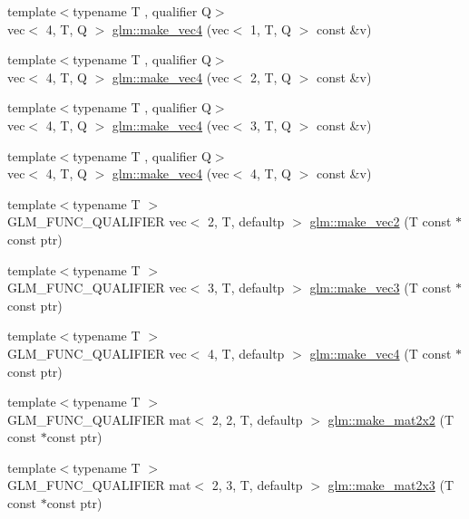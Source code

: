 \begin{DoxyCompactItemize}
{\footnotesize template$<$typename T , qualifier Q$>$ }\\vec$<$ 4, T, Q $>$ \hyperlink{group__gtc__type__ptr_ga600cb97f70c5d50d3a4a145e1cafbf37}{glm\+::make\+\_\+vec4} (vec$<$ 1, T, Q $>$ const \&v)
\item 
{\footnotesize template$<$typename T , qualifier Q$>$ }\\vec$<$ 4, T, Q $>$ \hyperlink{group__gtc__type__ptr_gaa9bd116caf28196fd1cf00b278286fa7}{glm\+::make\+\_\+vec4} (vec$<$ 2, T, Q $>$ const \&v)
\item 
{\footnotesize template$<$typename T , qualifier Q$>$ }\\vec$<$ 4, T, Q $>$ \hyperlink{group__gtc__type__ptr_ga4036328ba4702c74cbdfad1fc03d1b8f}{glm\+::make\+\_\+vec4} (vec$<$ 3, T, Q $>$ const \&v)
\item 
{\footnotesize template$<$typename T , qualifier Q$>$ }\\vec$<$ 4, T, Q $>$ \hyperlink{group__gtc__type__ptr_gaa95cb15732f708f613e65a0578895ae5}{glm\+::make\+\_\+vec4} (vec$<$ 4, T, Q $>$ const \&v)
\item 
{\footnotesize template$<$typename T $>$ }\\G\+L\+M\+\_\+\+F\+U\+N\+C\+\_\+\+Q\+U\+A\+L\+I\+F\+I\+ER vec$<$ 2, T, defaultp $>$ \hyperlink{group__gtc__type__ptr_ga81253cf7b0ebfbb1e70540c5774e6824}{glm\+::make\+\_\+vec2} (T const $\ast$const ptr)
\item 
{\footnotesize template$<$typename T $>$ }\\G\+L\+M\+\_\+\+F\+U\+N\+C\+\_\+\+Q\+U\+A\+L\+I\+F\+I\+ER vec$<$ 3, T, defaultp $>$ \hyperlink{group__gtc__type__ptr_gad9e0d36ff489cb30c65ad1fa40351651}{glm\+::make\+\_\+vec3} (T const $\ast$const ptr)
\item 
{\footnotesize template$<$typename T $>$ }\\G\+L\+M\+\_\+\+F\+U\+N\+C\+\_\+\+Q\+U\+A\+L\+I\+F\+I\+ER vec$<$ 4, T, defaultp $>$ \hyperlink{group__gtc__type__ptr_ga63f576518993efc22a969f18f80e29bb}{glm\+::make\+\_\+vec4} (T const $\ast$const ptr)
\item 
{\footnotesize template$<$typename T $>$ }\\G\+L\+M\+\_\+\+F\+U\+N\+C\+\_\+\+Q\+U\+A\+L\+I\+F\+I\+ER mat$<$ 2, 2, T, defaultp $>$ \hyperlink{group__gtc__type__ptr_gae49e1c7bcd5abec74d1c34155031f663}{glm\+::make\+\_\+mat2x2} (T const $\ast$const ptr)
\item 
{\footnotesize template$<$typename T $>$ }\\G\+L\+M\+\_\+\+F\+U\+N\+C\+\_\+\+Q\+U\+A\+L\+I\+F\+I\+ER mat$<$ 2, 3, T, defaultp $>$ \hyperlink{group__gtc__type__ptr_ga21982104164789cf8985483aaefc25e8}{glm\+::make\+\_\+mat2x3} (T const $\ast$const ptr)

\end{DoxyCompactItemize}
